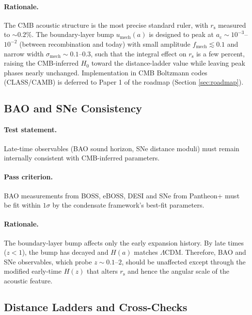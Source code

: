 \documentclass[11pt,a4paper]{article}
\newcommand{\ac}{a_{\mathrm{c}}}
\newcommand{\rs}{r_{\mathrm{s}}}
\newcommand{\sigmamech}{\sigma_{\mathrm{mech}}}
\newcommand{\fmech}{f_{\mathrm{mech}}}
\newcommand{\umech}{u_{\mathrm{mech}}}
\theoremstyle{definition}
\begin{document}
\paragraph{Rationale.}
The CMB acoustic structure is the most precise standard ruler, with $\rs$ measured to $\sim 0.2\%$. The boundary-layer bump $\umech(a)$ is designed to peak at $\ac \sim 10^{-3}$--$10^{-2}$ (between recombination and today) with small amplitude $\fmech \lesssim 0.1$ and narrow width $\sigmamech \sim 0.1$--$0.3$, such that the integral effect on $\rs$ is a few percent, raising the CMB-inferred $H_0$ toward the distance-ladder value \cite{Poulin2019,EDEReview2023} while leaving peak phases nearly unchanged. Implementation in CMB Boltzmann codes (CLASS/CAMB) is deferred to Paper 1 of the roadmap (Section \ref{sec:roadmap}).

\subsection{BAO and SNe Consistency}
\label{sec:BAO_SNe}

\paragraph{Test statement.}
Late-time observables (BAO sound horizon, SNe distance moduli) must remain internally consistent with CMB-inferred parameters.

\paragraph{Pass criterion.}
BAO measurements from BOSS, eBOSS, DESI \cite{BOSS_BAO,eBOSS_BAO,DESI2024} and SNe from Pantheon+ \cite{PantheonPlus} must be fit within $1\sigma$ by the condensate framework's best-fit parameters.

\paragraph{Rationale.}
The boundary-layer bump affects only the early expansion history. By late times ($z < 1$), the bump has decayed and $H(a)$ matches $\Lambda$CDM. Therefore, BAO and SNe observables, which probe $z \sim 0.1$--$2$, should be unaffected except through the modified early-time $H(z)$ that alters $\rs$ and hence the angular scale of the acoustic feature.

\subsection{Distance Ladders and Cross-Checks}
\label{sec:distance_ladders}
\end{document}
